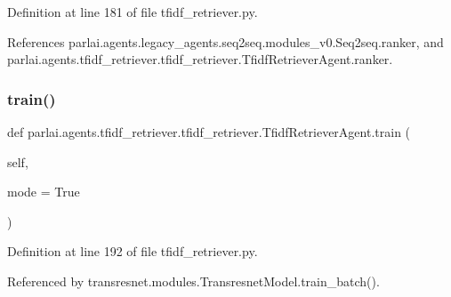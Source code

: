 Definition at line 181 of file tfidf\+\_\+retriever.\+py.



References parlai.\+agents.\+legacy\+\_\+agents.\+seq2seq.\+modules\+\_\+v0.\+Seq2seq.\+ranker, and parlai.\+agents.\+tfidf\+\_\+retriever.\+tfidf\+\_\+retriever.\+Tfidf\+Retriever\+Agent.\+ranker.

\mbox{\label{classparlai_1_1agents_1_1tfidf__retriever_1_1tfidf__retriever_1_1TfidfRetrieverAgent_abc3ce26084466682f25980e176d3ce38}} 
\subsubsection{\texorpdfstring{train()}{train()}}
{\footnotesize\ttfamily def parlai.\+agents.\+tfidf\+\_\+retriever.\+tfidf\+\_\+retriever.\+Tfidf\+Retriever\+Agent.\+train (\begin{DoxyParamCaption}\item[{}]{self,  }\item[{}]{mode = {\ttfamily True} }\end{DoxyParamCaption})}



Definition at line 192 of file tfidf\+\_\+retriever.\+py.



Referenced by transresnet.\+modules.\+Transresnet\+Model.\+train\+\_\+batch().

